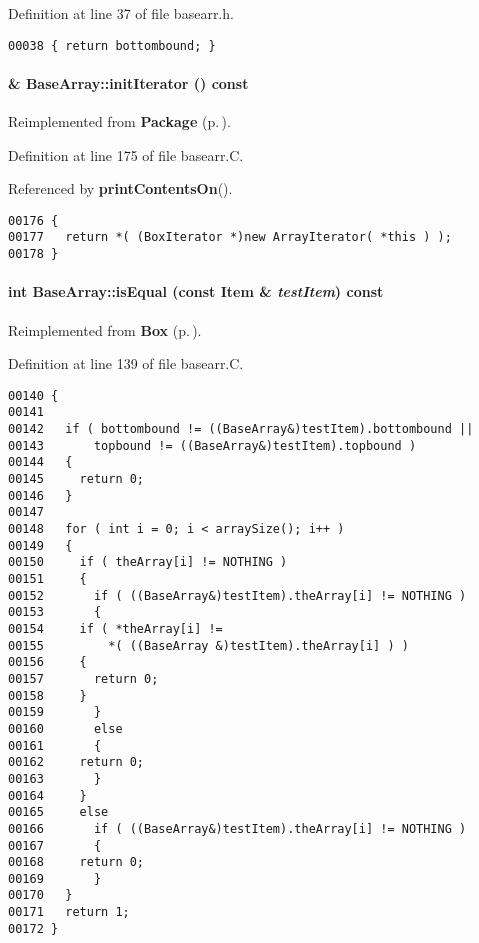 Definition at line 37 of file basearr.h.\small\begin{verbatim}00038 { return bottombound; }
\end{verbatim}\normalsize 
\label{BaseArray_a5}
\paragraph{ \& Base\-Array::init\-Iterator () const\hspace{0.3cm}{\tt  [virtual]}}\hfill



Reimplemented from {\bf Package} {\rm (p.\,\pageref{Package_a6})}.

Definition at line 175 of file basearr.C.

Referenced by {\bf print\-Contents\-On}().\small\begin{verbatim}00176 {
00177   return *( (BoxIterator *)new ArrayIterator( *this ) );
00178 }
\end{verbatim}\normalsize 
\label{BaseArray_a12}
\paragraph{\setlength{\rightskip}{0pt plus 5cm}int Base\-Array::is\-Equal (const {\bf Item} \& {\em test\-Item}) const\hspace{0.3cm}{\tt  [virtual]}}\hfill



Reimplemented from {\bf Box} {\rm (p.\,\pageref{Box_a6})}.

Definition at line 139 of file basearr.C.\small\begin{verbatim}00140 {
00141   
00142   if ( bottombound != ((BaseArray&)testItem).bottombound ||
00143       topbound != ((BaseArray&)testItem).topbound )
00144   {
00145     return 0;
00146   }
00147   
00148   for ( int i = 0; i < arraySize(); i++ )
00149   {
00150     if ( theArray[i] != NOTHING )
00151     {
00152       if ( ((BaseArray&)testItem).theArray[i] != NOTHING )
00153       {
00154     if ( *theArray[i] !=
00155         *( ((BaseArray &)testItem).theArray[i] ) )
00156     {
00157       return 0; 
00158     }
00159       }
00160       else 
00161       {
00162     return 0;
00163       }
00164     }
00165     else
00166       if ( ((BaseArray&)testItem).theArray[i] != NOTHING )
00167       {
00168     return 0;  
00169       }
00170   }  
00171   return 1;
00172 }
\end{verbatim}\normalsize 
\label{BaseArray_b0}
